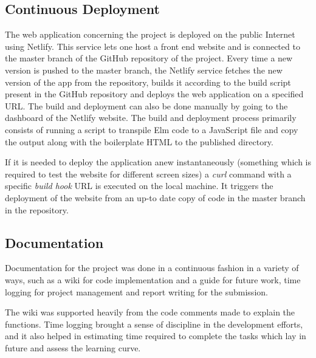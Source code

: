 \subsection{Continuous Deployment}
The web application concerning the project is deployed on the public Internet 
using Netlify. This service lets one host a front end website and is
connected to the master branch of the GitHub repository of the project. Every
time a new version is pushed to the master branch, the Netlify service fetches the new
version of the app from the repository, builds it according to the build script
present in the GitHub repository and deploys the web application on a specified
URL. The build and deployment can also be done manually by going to the
dashboard of the Netlify website. The build and deployment process primarily
consists of running a script to transpile Elm code to a JavaScript file and copy
the output along with the boilerplate HTML to the published directory.

If it is needed to deploy the application anew instantaneously (something which
is required to test the website for different screen sizes) a \emph{curl}
command with a specific \emph{build hook} URL is executed on the local
machine.  It triggers the deployment of the website from an up-to date copy of code in the master branch in the
repository.


\subsection{Documentation}
Documentation for the project was done in a continuous fashion in a variety of
ways, such as a wiki for code implementation and a guide for future work, time
logging for project management and report writing for the submission. 

The wiki was supported heavily from the code comments made to explain the
functions. Time logging brought a sense of discipline in the development efforts, and
it also helped in estimating time required to complete the tasks which lay in
future and assess the learning curve.
